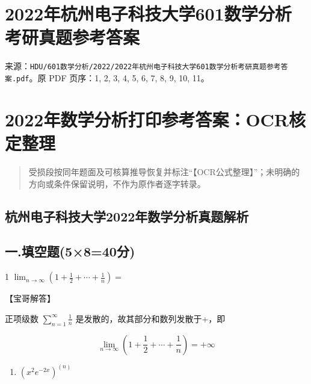 \documentclass[11pt,fontset=fandol]{ctexart}
\providecommand{\tightlist}{\setlength{\itemsep}{0pt}\setlength{\parskip}{0pt}}
\begin{document}
\section{2022年杭州电子科技大学601数学分析考研真题参考答案}\label{ux5e74ux676dux5ddeux7535ux5b50ux79d1ux6280ux5927ux5b66601ux6570ux5b66ux5206ux6790ux8003ux7814ux771fux9898ux53c2ux8003ux7b54ux6848}

来源：\texttt{HDU/601数学分析/2022/2022年杭州电子科技大学601数学分析考研真题参考答案.pdf}。原
PDF 页序：1, 2, 3, 4, 5, 6, 7, 8, 9, 10, 11。

\section{2022年数学分析打印参考答案：OCR核定整理}\label{ux5e74ux6570ux5b66ux5206ux6790ux6253ux5370ux53c2ux8003ux7b54ux6848ocrux6838ux5b9aux6574ux7406}

\begin{quote}
受损段按同年题面及可核算推导恢复并标注``【OCR公式整理】''；未明确的方向或条件保留说明，不作为原作者逐字转录。
\end{quote}

\subsection{杭州电子科技大学2022年数学分析真题解析}\label{ux676dux5ddeux7535ux5b50ux79d1ux6280ux5927ux5b662022ux5e74ux6570ux5b66ux5206ux6790ux771fux9898ux89e3ux6790}

\subsection{一.填空题(5×8=40分)}\label{ux4e00.ux586bux7a7aux98985840ux5206}

1
\(\lim _ { n \to \infty } ( 1 + { \frac { 1 } { 2 } } + \cdots + { \frac { 1 } { n } } ) =\)

【宝哥解答】

正项级数 \(\sum _ { n = 1 } ^ { \infty } { \frac { 1 } { n } }\)
是发散的，故其部分和数列发散于+，即

\[
\lim _ { n \to \infty } ( 1 + { \frac { 1 } { 2 } } + \cdots + { \frac { 1 } { n } } ) = + \infty
\]

\begin{enumerate}
\def\labelenumi{\arabic{enumi}.}
\setcounter{enumi}{1}
\tightlist
\item
  \(( x ^ { 2 } e ^ { - 2 x } ) ^ { ( n ) }\)
\end{enumerate}
\end{document}
